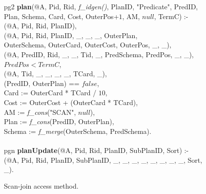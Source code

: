 \begin{figure}
\ssp
\centering
\begin{boxedminipage}{\linewidth}
pg2 {\small \bf plan}(@A, Pid, Rid, {\em f\_idgen()}, PlanID, "Predicate", PredID, \\
\datalogspace \xspace Plan, Schema, Card, Cost, OuterPos+$1$, AM, $null$, TermC) :-\\
(@A, Pid, Rid, PlanID),\\
(@A, Pid, Rid, PlanID, \_, \_, \_, OuterPlan, \\
\datalogspace \datalogspace OuterSchema, OuterCard, OuterCost, OuterPos, \_, \_),  \\   
(@A, PredID, Rid, \_, \_, Tid, \_, PredSchema, PredPos, \_, \_),\\
\datalogspace $PredPos < TermC$,\\
(@A, Tid, \_, \_, \_, \_, TCard, \_),\\
(PredID, OuterPlan) == $false$,\\
\datalogspace Card := OuterCard * TCard / $10$,\\
\datalogspace Cost := OuterCost + (OuterCard * TCard),\\
\datalogspace AM := {\em f\_cons}("SCAN", $null$), \\
\datalogspace Plan := {\em f\_cons}(PredID, OuterPlan), \\
\datalogspace Schema := {\em f\_merge}(OuterSchema, PredSchema).\\
\\
pgn {\small \bf planUpdate}(@A, Pid, Rid, PlanID, SubPlanID, Sort) :- \\
(@A, Pid, Rid, PlanID, SubPlanID, \_, \_, \_, \_, \_, \_, \_, \_, Sort, \_).
\end{boxedminipage}
\caption{\label{fig:plangen1}Scan-join access method.}
\end{figure}

